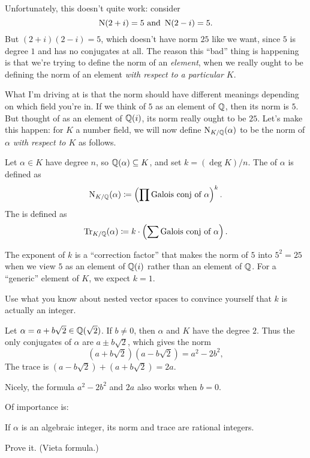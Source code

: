 Unfortunately, this doesn't quite work: consider
\[ \operatorname{N}(2+i) = 5 \text{ and } \operatorname{N}(2-i) = 5. \]
But $(2+i)(2-i) = 5$, which doesn't have norm $25$ like we want,
since $5$ is degree $1$ and has no conjugates at all.
The reason this ``bad'' thing is happening is that we're
trying to define the norm of an \emph{element},
when we really ought to be defining the norm of an element
\emph{with respect to a particular $K$}.

What I'm driving at is that the norm should have
different meanings depending on which field you're in.
If we think of $5$ as an element of $\mathbb Q$, then its norm is $5$.
But thought of as an element of $\mathbb Q(i)$, its norm really ought to be $25$.
Let's make this happen: for $K$ a number field, we will now define $\operatorname{N}_{K/\mathbb Q}(\alpha)$
to be the norm of $\alpha$ \emph{with respect to $K$} as follows.
\begin{definition}
	Let $\alpha \in K$ have degree $n$, so $\mathbb Q(\alpha) \subseteq K$, and set $k = (\deg K) / n$.
	The  of $\alpha$ is defined as
	\[ \operatorname{N}_{K/\mathbb Q}(\alpha) \coloneqq \left( \prod \text{Galois conj of $\alpha$} \right)^k. \]
	The  is defined as
	\[ \operatorname{Tr}_{K/\mathbb Q}(\alpha) \coloneqq k \cdot \left( \sum \text{Galois conj of $\alpha$} \right). \]
\end{definition}
The exponent of $k$ is a ``correction factor'' that makes the norm of $5$ into $5^2=25$
when we view $5$ as an element of $\mathbb Q(i)$ rather than an element of $\mathbb Q$.
For a ``generic'' element of $K$, we expect $k = 1$.
\begin{exercise}
	Use what you know about nested vector spaces to convince
	yourself that $k$ is actually an integer.
\end{exercise}
\begin{example}
	Let $\alpha = a+b\sqrt2 \in \mathbb Q(\sqrt2)$.
	If $b \neq 0$, then $\alpha$ and $K$ have the degree $2$.
	Thus the only conjugates of $\alpha$ are $a \pm b\sqrt2$, which gives
	the norm \[ (a+b\sqrt2)(a-b\sqrt2) = a^2-2b^2, \]
	The trace is $(a-b\sqrt2) + (a+b\sqrt2) = 2a$.

	Nicely, the formula $a^2-2b^2$ and $2a$ also works when $b=0$.
\end{example}
Of importance is:
\begin{proposition}
	If $\alpha$ is an algebraic integer, its norm and trace
	are rational integers.
\end{proposition}
\begin{ques}
	Prove it. (Vieta formula.)
\end{ques}


